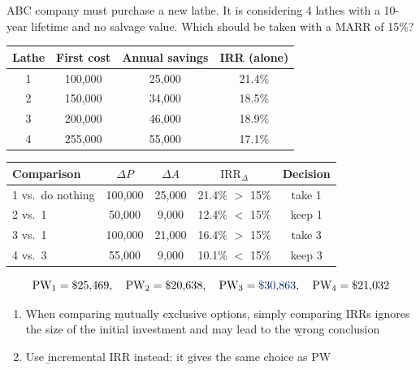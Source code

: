 \begin{example}
    ABC company must purchase a new lathe. It is considering 4 lathes with
    a 10-year lifetime and no salvage value. Which should be taken with a
    MARR of 15\%?
    \\
    \begin{center}
    \begin{tabular}{cccc}
        \toprule
        Lathe & First cost & Annual savings & IRR (alone) \\
        \midrule
        1 & 100,000 & 25,000 & 21.4\% \\
        2 & 150,000 & 34,000 & 18.5\% \\
        3 & 200,000 & 46,000 & 18.9\% \\
        4 & 255,000 & 55,000 & 17.1\% \\
        \bottomrule
    \end{tabular}
    \end{center}
    \begin{center}
    \begin{tabular}{lcccc}
        \toprule
        Comparison & $\Delta P$ & $\Delta A$ & $\text{IRR}_\Delta$ & Decision \\
        \midrule
        1 vs.\ do nothing & 100,000 & 25,000 & 21.4\% $>$ 15\% & take 1 \\
        2 vs.\ 1 & 50,000 & 9,000 & 12.4\% $<$ 15\% & keep 1 \\
        3 vs.\ 1 & 100,000 & 21,000 & 16.4\% $>$ 15\% & take 3 \\
        4 vs.\ 3 & 55,000 & 9,000 & 10.1\% $<$ 15\% & keep 3 \\
        \bottomrule
    \end{tabular}
    \end{center}
    \[\text{PW}_1 = \$25{,}469, \quad \text{PW}_2 = \$20{,}638, \quad \text{PW}_3 = \db{\$30{,}863}, \quad \text{PW}_4 = \$21{,}032\]
\end{example}

\begin{enumerate}
    \item When comparing \b{mutually exclusive} options, simply comparing IRRs ignores the size of the initial investment and may lead to the \b{wrong conclusion}
    \item Use \b{incremental IRR} instead: it gives the same choice as PW
\end{enumerate}

